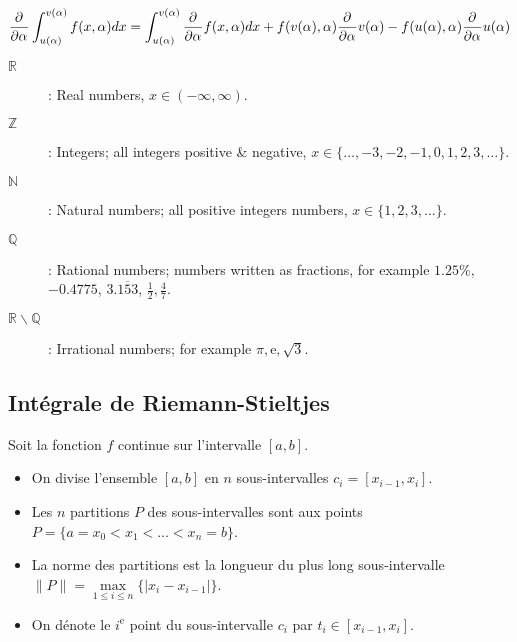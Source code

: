 \documentclass[10pt, french]{article}
\begin{document}
\begin{multicols*}{2}
\begin{definitionNOHFILL}
	\setlength{\mathindent}{-.24cm}
\begin{equation*}
	\frac{\partial^{}}{\partial \alpha^{}} \int_{u(\alpha)}^{v(\alpha)} f(x, \alpha) dx = 
	\int_{u(\alpha)}^{v(\alpha)} \frac{\partial^{}}{\partial \alpha^{}}  f(x, \alpha) dx + f(v(\alpha), \alpha) \frac{\partial^{}}{\partial \alpha^{}} v(\alpha) - f(u(\alpha), \alpha) \frac{\partial^{}}{\partial \alpha^{}} u(\alpha)
\end{equation*}
	\setlength{\mathindent}{1cm}
\end{definitionNOHFILL}

\begin{definitionNOHFILL}[Domaines]
\begin{description}
	\item[$\mathds{R}$]: Real numbers, $x \in (-\infty, \infty)$.
	\item[$\mathds{Z}$]: Integers; all integers positive \& negative, $x \in \{\dots, -3, -2, -1, 0, 1, 2, 3, \dots\}$.
	\item[$\mathds{N}$]: Natural numbers; all positive integers numbers, $x \in \{1, 2, 3, \dots\}$.
	\item[$\mathds{Q}$]: Rational numbers; numbers written as fractions, for example $1.25\%$, $-0.4775$, $3.\overline{153}$, $\frac{1}{2}, \frac{4}{7}$.	
	\item[$\mathds{R} \backslash \mathds{Q}$]: Irrational numbers; for example $\pi, \mathrm{e}, \sqrt{3}$.
\end{description}
\end{definitionNOHFILL}

\subsection*{Intégrale de Riemann-Stieltjes}
\begin{rappel_enhanced}
Soit la fonction $f$ continue sur l'intervalle $[a, b]$.
\begin{itemize}
	\item	On divise l'ensemble $[a, b]$ en $n$ sous-intervalles $c_{i} = [x_{i - 1}, x_{i}]$.
	\item	Les $n$ partitions $P$ des sous-intervalles sont aux points $P	=	\{a	=	x_{0} < x_{1} < \hdots < x_{n} = b\}$. 
	\item	La norme des partitions est la longueur du plus long sous-intervalle $\lVert P \rVert	=	\underset{1 \leq i \leq n}{\max}\{|x_{i} - x_{i - 1}|\}$.
	\item	On dénote le $i^{\text{e}}$ point du sous-intervalle $c_{i}$ par $t_{i} \in [x_{i - 1}, x_{i}]$.
\end{itemize}


\end{rappel_enhanced}
\end{multicols*}
\end{document}
